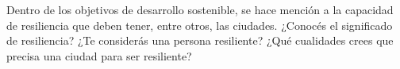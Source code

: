 

%
%
%



\clearpage
{}
\section*{\boldit{\textcolor{waveBlue2}{Ejercicio 5}}}Dentro de los objetivos de desarrollo sostenible, se 
hace mención a la capacidad de resiliencia que deben tener, entre otros, las ciudades. ¿Conocés el significado 
de resiliencia? ¿Te considerás una persona resiliente? ¿Qué cualidades crees que precisa una ciudad para ser resiliente?

